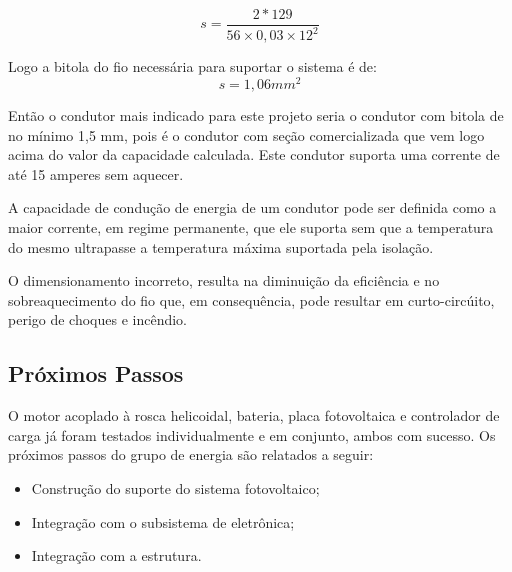 \begin{equation}
s= \frac{2*129}{56 \times 0,03\times {12}^{2}}
\end{equation}
\par Logo a bitola do fio necessária para suportar o sistema é de:
\begin{equation}
s= 1,06 mm^2
\end{equation}
\par Então o condutor mais indicado para este projeto seria o condutor com bitola de no mínimo 1,5 mm, pois é o condutor com seção comercializada que vem logo acima do valor da capacidade calculada. Este condutor suporta uma corrente de até 15 amperes sem aquecer.
\par A capacidade de condução de energia de um condutor pode ser definida como  a maior corrente, em regime permanente, que ele suporta sem que a temperatura do mesmo ultrapasse a temperatura máxima suportada pela isolação.
\par O dimensionamento incorreto, resulta na diminuição da eficiência e no sobreaquecimento do fio que, em consequência, pode resultar em curto-circúito, perigo de choques e incêndio.


\subsection{Próximos Passos}
O motor acoplado à rosca helicoidal, bateria, placa fotovoltaica e controlador de carga já foram testados individualmente e em conjunto, ambos com sucesso. Os próximos passos do grupo de energia são relatados a seguir:

\begin{itemize}
    \item{Construção do suporte do sistema fotovoltaico;}
    \item{Integração com o subsistema de eletrônica;}
    \item{Integração com a estrutura.}
\end{itemize}

